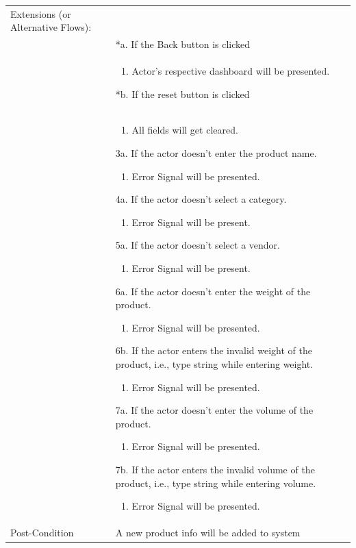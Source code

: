 \documentclass[12pt,a4paper]{article}
\begin{document}
\begin{longtable}{| p{3cm}|p{12cm}|}
Extensions (or Alternative Flows):\\
& *a. If the Back button is clicked \\
& \begin{enumerate}
		\item Actor's respective dashboard will be presented.
	\end{enumerate}
*b. If the reset button is clicked \\
&	\begin{enumerate}
		\item All fields will get cleared.
	\end{enumerate}
3a. If the actor doesn't enter the product name.
 	\begin{enumerate}
		\item Error Signal will be presented.
	\end{enumerate}
4a. If the actor doesn't select a category.
 	\begin{enumerate}
		\item Error Signal will be present.
	\end{enumerate}

5a. If the actor doesn't select a vendor.
 	\begin{enumerate}
		\item Error Signal will be present.
	\end{enumerate}

6a. If the actor doesn't enter the weight of the product.
 	\begin{enumerate}
		\item Error Signal will be presented.
	\end{enumerate}
6b. If the actor enters the invalid weight of the product, i.e., type string while entering weight.
 	\begin{enumerate}
		\item Error Signal will be presented.
	\end{enumerate}
7a. If the actor doesn't enter the volume of the product.
 	\begin{enumerate}
		\item Error Signal will be presented.
	\end{enumerate}
7b. If the actor enters the invalid volume of the product, i.e., type string while entering volume.
 	\begin{enumerate}
		\item Error Signal will be presented.
	\end{enumerate}
\\ \hline
Post-Condition &    A new product info will be added to system\\ \hline

\end{longtable}
\end{document}
